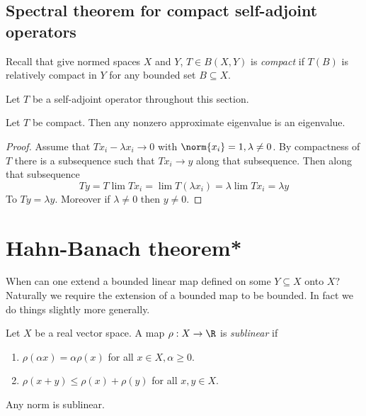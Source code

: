\documentclass[a4paper]{article}
\begin{document}
\subsection{Spectral theorem for compact self-adjoint operators}

Recall that give normed spaces \(X\) and \(Y\), \(T \in B(X, Y)\) is \emph{compact} if \(T(B)\) is relatively compact in \(Y\) for any bounded set \(B \subseteq X\).

Let \(T\) be a self-adjoint operator throughout this section.

\begin{lemma}
  Let \(T\) be compact. Then any nonzero approximate eigenvalue is an eigenvalue.
\end{lemma}

\begin{proof}
  Assume that \(Tx_i - \lambda x_i \to 0\) with \(\norm{x_i} = 1, \lambda \neq 0\). By compactness of \(T\) there is a subsequence such that \(Tx_i \to y\) along that subsequence. Then along that subsequence
  \[
    Ty
    = T \lim Tx_i
    = \lim T(\lambda x_i)
    = \lambda \lim Tx_i
    = \lambda y
  \]
  To \(Ty = \lambda y\). Moreover if \(\lambda \neq 0\) then \(y \neq 0\).
\end{proof}







\section{Hahn-Banach theorem*}

When can one extend a bounded linear map defined on some \(Y \subseteq X\) onto \(X\)? Naturally we require the extension of a bounded map to be bounded. In fact we do things slightly more generally.

\begin{definition}
  Let \(X\) be a real vector space. A map \(\rho: X \to \R\) is \emph{sublinear} if
  \begin{enumerate}
  \item \(\rho(\alpha x) = \alpha \rho(x)\) for all \(x \in X, \alpha \geq 0\).
  \item \(\rho(x + y) \leq \rho(x) + \rho(y)\) for all \(x, y \in X\).
  \end{enumerate}
\end{definition}

\begin{eg}
  Any norm is sublinear.
\end{eg}
\end{document}
